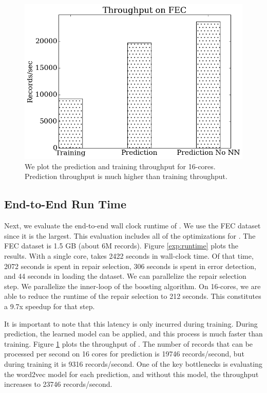 \begin{figure}[t]
\centering
\includegraphics[width=0.8\columnwidth]{exp/runtime2.png}
\caption{We plot the prediction and training throughput for 16-cores. Prediction throughput is much higher than training throughput.\label{exp:tp}}
\end{figure}

\subsection{End-to-End Run Time}
Next, we evaluate the end-to-end wall clock runtime of \sys. We use the FEC dataset since it is the largest. This evaluation includes all of the optimizations for \sys. The FEC dataset is 1.5 GB (about 6M records). 
Figure \ref{exp:runtime} plots the results.
With a single core, \sys takes 2422 seconds in wall-clock time. Of that time, 2072 seconds is spent in repair selection, 306 seconds is spent in error detection, and 44 seconds in loading the dataset.
We can parallelize the repair selection step. We parallelize the inner-loop of the boosting algorithm. On 16-cores, we are able to reduce the runtime of the repair selection to 212 seconds. This constitutes a 9.7x speedup for that step.

It is important to note that this latency is only incurred during training. During prediction, the learned model can be applied, and this process is much faster than training. 
Figure \ref{exp:tp} plots the throughput of \sys.
The number of records that can be processed per second on 16 cores for prediction is 19746 records/second, but during training it is 9316 records/second. One of the key bottlenecks is evaluating the word2vec model for each prediction, and without this model, the throughput increases to 23746 records/second.

